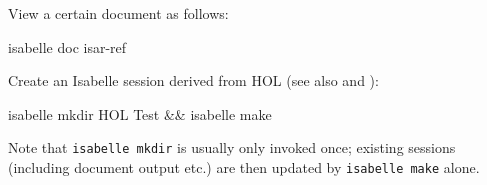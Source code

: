 \begin{isabellebody}
\begin{isamarkuptext}
  View a certain document as follows:
\begin{ttbox}
  isabelle doc isar-ref
\end{ttbox}

  Create an Isabelle session derived from HOL (see also
   and ):
\begin{ttbox}
  isabelle mkdir HOL Test && isabelle make
\end{ttbox}
  Note that \verb|isabelle mkdir| is usually only invoked once;
  existing sessions (including document output etc.) are then updated
  by \verb|isabelle make| alone.%
\end{isamarkuptext}%
\isamarkuptrue%
%
\isadelimtheory
%
\endisadelimtheory
%
\isatagtheory
{}\isamarkupfalse%
%
\endisatagtheory
{\isafoldtheory}%
%
\isadelimtheory
%
\endisadelimtheory
\end{isabellebody}%
